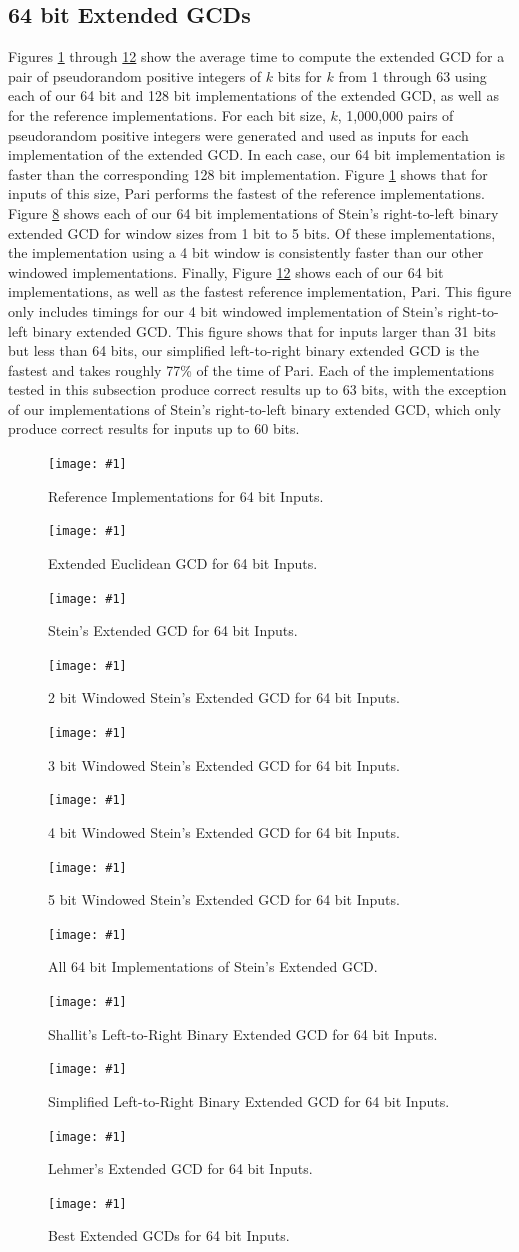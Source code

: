 \documentclass{ucalgthes1}
\theoremstyle{definition}
\newcommand{\mygraph}[3]{
	\begin{figure}[htb]
	\centering
	\texttt{[image: \#1]}
	\caption{#3}
	\label{#2}
	\end{figure}
}
\begin{document}
\clearpage

\subsection{64 bit Extended GCDs}

Figures \ref{fig:gcdRef64} through \ref{fig:gcdBest64} show the average time to compute the extended GCD for a pair of pseudorandom positive integers of $k$ bits for $k$ from 1 through 63 using each of our 64 bit and 128 bit implementations of the extended GCD, as well as for the reference implementations.  For each bit size, $k$, 1,000,000 pairs of pseudorandom positive integers were generated and used as inputs for each implementation of the extended GCD.  In each case, our 64 bit implementation is faster than the corresponding 128 bit implementation.  Figure \ref{fig:gcdRef64} shows that for inputs of this size, Pari performs the fastest of the reference implementations.  Figure \ref{fig:gcdSteins64} shows each of our 64 bit implementations of Stein's right-to-left binary extended GCD for window sizes from 1 bit to 5 bits.  Of these implementations, the implementation using a 4 bit window is consistently faster than our other windowed implementations.  Finally, Figure \ref{fig:gcdBest64} shows each of our 64 bit implementations, as well as the fastest reference implementation, Pari.   This figure only includes timings for our 4 bit windowed implementation of Stein's right-to-left binary extended GCD.  This figure shows that for inputs larger than 31 bits but less than 64 bits, our simplified left-to-right binary extended GCD is the fastest and takes roughly 77\% of the time of Pari.   Each of the implementations tested in this subsection produce correct results up to 63 bits, with the exception of our implementations of Stein's right-to-left binary extended GCD, which only produce correct results for inputs up to 60 bits.

\mygraph{reference-impl-64}{fig:gcdRef64}{Reference Implementations for 64 bit Inputs.}
\mygraph{divrem-64}{fig:gcdDivrem64}{Extended Euclidean GCD for 64 bit Inputs.}
\mygraph{stein1-64}{fig:gcdStein1-64}{Stein's Extended GCD for 64 bit Inputs.}
\mygraph{stein2-64}{fig:gcdStein2-64}{2 bit Windowed Stein's Extended GCD for 64 bit Inputs.}
\mygraph{stein3-64}{fig:gcdStein3-64}{3 bit Windowed Stein's Extended GCD for 64 bit Inputs.}
\mygraph{stein4-64}{fig:gcdStein4-64}{4 bit Windowed Stein's Extended GCD for 64 bit Inputs.}
\mygraph{stein5-64}{fig:gcdStein5-64}{5 bit Windowed Stein's Extended GCD for 64 bit Inputs.}
\mygraph{steins-64}{fig:gcdSteins64}{All 64 bit Implementations of Stein's Extended GCD.}
\mygraph{shallit-64}{fig:gcdShallit64}{Shallit's Left-to-Right Binary Extended GCD for 64 bit Inputs.}
\mygraph{binary_l2r-64}{fig:gcdL2R64}{Simplified Left-to-Right Binary Extended GCD for 64 bit Inputs.}
\mygraph{lehmer-64}{fig:gcdLehmer64}{Lehmer's Extended GCD for 64 bit Inputs.}
\mygraph{best-64}{fig:gcdBest64}{Best Extended GCDs for 64 bit Inputs.}
\end{document}

